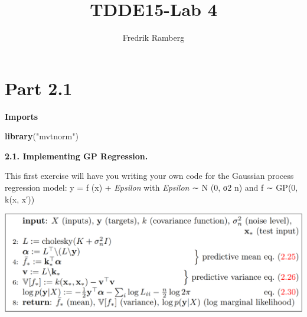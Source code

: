 \documentclass[
]{article}
\title{TDDE15-Lab 4}
\author{Fredrik Ramberg}
\date{}
\newenvironment{Shaded}{\begin{snugshade}}{\end{snugshade}}
\newcommand{\FunctionTok}[1]{\textcolor[rgb]{0.13,0.29,0.53}{\textbf{#1}}}
\newcommand{\NormalTok}[1]{#1}
\newcommand{\StringTok}[1]{\textcolor[rgb]{0.31,0.60,0.02}{#1}}
\begin{document}
\maketitle

\section{Part 2.1}\label{part-2.1}

\textbf{Imports}

\begin{Shaded}
\begin{Highlighting}[]
\FunctionTok{library}\NormalTok{(}\StringTok{"mvtnorm"}\NormalTok{)}
\end{Highlighting}
\end{Shaded}

\textbf{2.1. Implementing GP Regression.}

This first exercise will have you writing your own code for the Gaussian
process regression model: y = f (x) + \emph{Epsilon} with \emph{Epsilon}
∼ N (0, σ2 n) and f ∼ GP(0, k(x, x′))

\includegraphics[width=5.54167in,height=\textheight]{images/Screenshot 2024-10-13 at 15.21.25.png}
\end{document}
